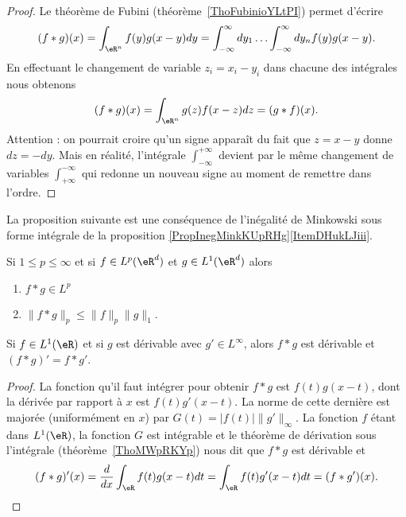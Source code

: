 \begin{proof}
    Le théorème de Fubini (théorème~\ref{ThoFubinioYLtPI}) permet d'écrire
    \begin{equation}
        (f*g)(x)=\int_{\eR^n}f(y)g(x-y)dy=\int_{-\infty}^{\infty}dy_1\ldots \int_{-\infty}^{\infty}dy_nf(y)g(x-y).
    \end{equation}
    En effectuant le changement de variable \( z_i=x_i-y_i\) dans chacune des intégrales nous obtenons
    \begin{equation}
        (f*g)(x)=\int_{\eR^n}g(z)f(x-z)dz=(g*f)(x).
    \end{equation}
    Attention : on pourrait croire qu'un signe apparaît du fait que \( z=x-y\) donne \( dz=-dy\). Mais en réalité, l'intégrale \( \int_{-\infty}^{+\infty}\) devient par le même changement de variables \( \int_{+\infty}^{-\infty}\) qui redonne un nouveau signe au moment de remettre dans l'ordre.
\end{proof}

La proposition suivante est une conséquence de l'inégalité de Minkowski sous forme intégrale de la proposition \ref{PropInegMinkKUpRHg}\ref{ItemDHukLJiii}.
\begin{proposition}     \label{PROPooDMMCooPTuQuS}
    Si \( 1\leq p\leq \infty\) et si \( f\in L^p(\eR^d)\) et \( g\in L^1(\eR^d)\) alors
    \begin{enumerate}
        \item
            \( f*g\in L^p\)
        \item
            \( \| f*g \|_p\leq \| f \|_p\| g \|_1\).
    \end{enumerate}
\end{proposition}

\begin{proposition} \label{PropHNbdMQe}
    Si \( f\in L^1(\eR)\) et si \( g\) est dérivable avec \( g'\in L^{\infty}\), alors \( f*g\) est dérivable et \( (f*g)'=f*g'\).
\end{proposition}

\begin{proof}
    La fonction qu'il faut intégrer pour obtenir \( f*g\) est $f(t)g(x-t)$, dont la dérivée par rapport à \( x\) est \( f(t)g'(x-t)\). La norme de cette dernière est majorée (uniformément en \( x\)) par \( G(t)=| f(t) | \| g' \|_{\infty}\). La fonction \( f\) étant dans \( L^1(\eR)\), la fonction \( G\) est intégrable et le théorème de dérivation sous l'intégrale (théorème~\ref{ThoMWpRKYp}) nous dit que \( f*g\) est dérivable et
    \begin{equation}
        (f*g)'(x)=\frac{ d }{ dx }\int_{\eR}f(t)g(x-t)dt=\int_{\eR}f(t)g'(x-t)dt=(f*g')(x).
    \end{equation}
\end{proof}

